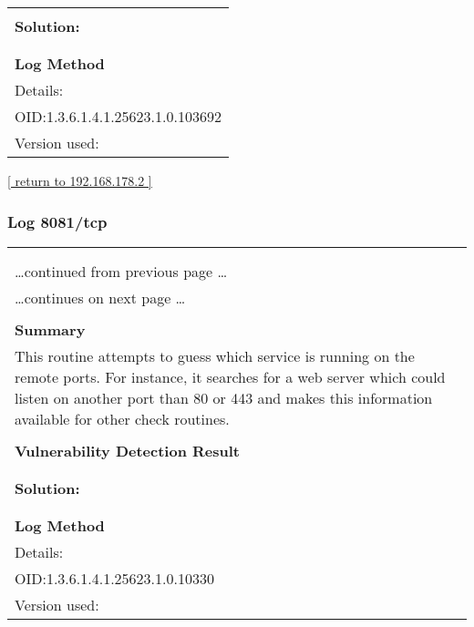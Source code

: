 \documentclass{article}
\begin{document}
\begin{longtable}{|p{}|}
          \hline
          \\
\textbf{Solution:}\\
\\


        \hline
        \\
\textbf{Log Method}\\
Details:
\rowcolor{white}{\verb=SSL/TLS: Collect and Report Certificate Details=}\\
OID:1.3.6.1.4.1.25623.1.0.103692\\
Version used:
\rowcolor{white}{\verb=2021-12-10T12:48:00Z=}\\
\end{longtable}

\begin{footnotesize}\hyperref[host:192.168.178.2]{[ return to 192.168.178.2 ]}\end{footnotesize}
\subsubsection{Log 8081/tcp}
\label{port:192.168.178.2 8081/tcp Log}

\begin{longtable}{|p{}|}
\hline
\rowcolor{gvm_log}{\color{white}{Log (CVSS: 0.0) }}\\
\rowcolor{gvm_log}{\color{white}{NVT: Services}}\\
\hline
\endfirsthead
\hfill\ldots continued from previous page \ldots \\
\hline
\endhead
\hline
\ldots continues on next page \ldots \\
\endfoot
\hline
\endlastfoot
\\
\textbf{Summary}\\
This routine attempts to guess which service is running on the
  remote ports. For instance, it searches for a web server which could listen on another port than
  80 or 443 and makes this information available for other check routines.\\

        \hline
        \\
\textbf{Vulnerability Detection Result}\\
\rowcolor{white}{\verb=A web server is running on this port=}\\

          \hline
          \\
\textbf{Solution:}\\
\\


        \hline
        \\
\textbf{Log Method}\\
Details:
\rowcolor{white}{\verb=Services=}\\
OID:1.3.6.1.4.1.25623.1.0.10330\\
Version used:
\rowcolor{white}{\verb=2021-03-15T10:42:03Z=}\\
\end{longtable}
\end{document}
